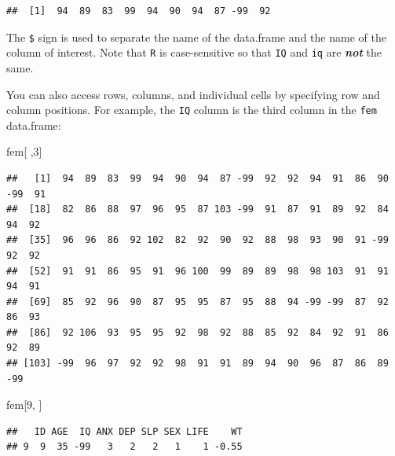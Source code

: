 \documentclass[12pt,]{book}
\newenvironment{Shaded}{\begin{snugshade}}{\end{snugshade}}
\newcommand{\DecValTok}[1]{\textcolor[rgb]{0.00,0.00,0.81}{#1}}
\newcommand{\OperatorTok}[1]{\textcolor[rgb]{0.81,0.36,0.00}{\textbf{#1}}}
\newcommand{\NormalTok}[1]{#1}
\theoremstyle{definition}
\theoremstyle{definition}
\theoremstyle{definition}
\theoremstyle{remark}
\begin{document}
\begin{Shaded}
\end{Shaded}

\begin{verbatim}
##  [1]  94  89  83  99  94  90  94  87 -99  92
\end{verbatim}

The \texttt{\$} sign is used to separate the name of the data.frame and
the name of the column of interest. Note that \texttt{R} is
case-sensitive so that \texttt{IQ} and \texttt{iq} are
\textbf{\emph{not}} the same.

You can also access rows, columns, and individual cells by specifying
row and column positions. For example, the \texttt{IQ} column is the
third column in the \texttt{fem} data.frame:

\begin{Shaded}
\begin{Highlighting}[]
\NormalTok{fem[ ,}\DecValTok{3}\NormalTok{]}
\end{Highlighting}
\end{Shaded}

\begin{verbatim}
##   [1]  94  89  83  99  94  90  94  87 -99  92  92  94  91  86  90 -99  91
##  [18]  82  86  88  97  96  95  87 103 -99  91  87  91  89  92  84  94  92
##  [35]  96  96  86  92 102  82  92  90  92  88  98  93  90  91 -99  92  92
##  [52]  91  91  86  95  91  96 100  99  89  89  98  98 103  91  91  94  91
##  [69]  85  92  96  90  87  95  95  87  95  88  94 -99 -99  87  92  86  93
##  [86]  92 106  93  95  95  92  98  92  88  85  92  84  92  91  86  92  89
## [103] -99  96  97  92  92  98  91  91  89  94  90  96  87  86  89 -99
\end{verbatim}

\begin{Shaded}
\begin{Highlighting}[]
\NormalTok{fem[}\DecValTok{9}\NormalTok{, ]}
\end{Highlighting}
\end{Shaded}

\begin{verbatim}
##   ID AGE  IQ ANX DEP SLP SEX LIFE    WT
## 9  9  35 -99   3   2   2   1    1 -0.55
\end{verbatim}
\end{document}
